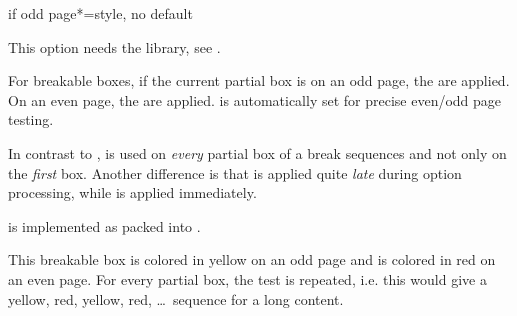 \clearpage
\begin{docTcbKey}[][doc new=2015-11-13]{if odd page*}{=}{style, no default}
\begin{marker}
This option needs the  library, see .
\end{marker}
For breakable boxes, if the current partial box is on an odd page, the  are applied.
On an even page, the  are applied.
 is automatically set for precise even/odd page testing.

In contrast to ,  is used
on \emph{every} partial box of a break sequences and not only on the
\emph{first} box. Another difference is that 
is applied quite \emph{late} during option processing, while
 is applied immediately.

 is implemented as 
packed into .

\begin{dispExample}
\begin{tcolorbox}[breakable,if odd page*={colback=yellow!50}{colback=red!50}]
  This breakable box is colored in yellow on an odd page
  and is colored in red on an even page. For every partial box, the
  test is repeated, i.e. this would give a yellow, red, yellow, red, \ldots\
  sequence for a long content.
\end{tcolorbox}
\end{dispExample}
\end{docTcbKey}


